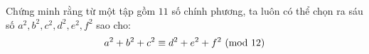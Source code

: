 \ifshowproblem
\begin{problem}\label{example:IND-2015-MO-P6}
	Chứng minh rằng từ một tập gồm \( 11 \) số chính phương, ta luôn có thể chọn ra sáu số \( a^2, b^2, c^2, d^2, e^2, f^2 \) sao cho:
	\[
		a^2 + b^2 + c^2 \equiv d^2 + e^2 + f^2 \ (\mathrm{mod}\ 12)
	\]
\end{problem}
\fi

\footnotemark
{}
\fi